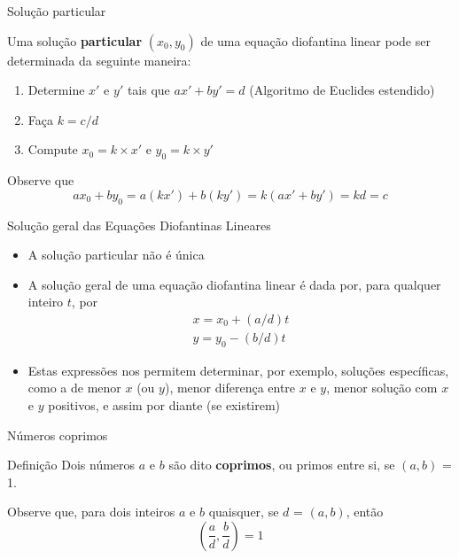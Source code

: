 \begin{frame}[fragile]{Solução particular}

    Uma solução \textbf{particular} $(x_0, y_0)$ de uma equação diofantina linear pode ser determinada da seguinte maneira:

    \begin{enumerate}
        \item Determine $x'$ e $y'$ tais que $ax' + by' = d$ (Algoritmo de Euclides estendido)
        \item Faça $k = c / d$
        \item Compute $x_0 = k \times x'$ e  $y_0 = k \times y'$
    \end{enumerate}

    \vspace{0.2in}

    Observe que $$ax_0 + by_0 = a(kx') + b(ky') = k(ax' + by') = kd = c$$

\end{frame}

\begin{frame}[fragile]{Solução geral das Equações Diofantinas Lineares}

    \begin{itemize}
        \item A solução particular não é única

        \item A solução geral de uma equação diofantina linear é dada por, para qualquer inteiro $t$, por
            $$
            \begin{matrix}
                x = x_0 + (a/d)t\\
                y = y_0 - (b/d)t
            \end{matrix}
            $$

        \item Estas expressões nos permitem determinar, por exemplo, soluções específicas, como a de menor $x$ (ou $y$), menor diferença entre $x$ e $y$, menor solução com $x$ e $y$ positivos, e assim por diante (se existirem)
    \end{itemize}

\end{frame}

\begin{frame}[fragile]{Números coprimos}

    \begin{block}{Definição}
        Dois números $a$ e $b$ são dito \textbf{coprimos}, ou primos entre si, se $(a, b)$ = 1.
    \end{block}

    \vspace{0.2in}

    Observe que, para dois inteiros $a$ e $b$ quaisquer, se $d$ = $(a, b)$, então 
    $$
    \left(\frac{a}{d}, \frac{b}{d}\right) = 1
    $$

\end{frame}

